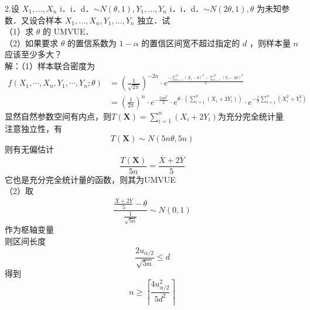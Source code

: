 \documentclass[UTF8]{ctexart}
\begin{document}
\noindent 2.设 $X_1, \ldots, X_n$ i．i．d．$\sim N(\theta, 1), Y_1, \ldots, Y_n$ i．i．d．$\sim N(2 \theta, 1), \theta$ 为未知参数．又设合样本 $X_1, \ldots, X_n, Y_1, \ldots, Y_n$ 独立．试\\
（1）求 $\theta$ 的 UMVUE．\\
（2）如果要求 $\theta$ 的置信系数为 $1-\alpha$ 的置信区间宽不超过指定的 $d$ ，则样本量 $n$应该至少多大？\\
解：（1）样本联合密度为
\[
\begin{aligned}
	f\left(X_1, \cdots, X_n, Y_1, \cdots, Y_n ; \theta\right) 
	&=\left(\frac{1}{\sqrt{2 \pi}}\right)^{-2 n} \cdot e^{\frac{-\sum_{i=1}^n\left(X_i-\theta\right)^2-\sum_{i=1}^n\left(Y_i-2 \theta\right)^2}{2}} \\
	& =\left(\frac{1}{2 \pi}\right)^n \cdot e^{-\frac{5 n \theta^2}{2}} \cdot e^{ \theta \cdot\left(\sum_{i=1}^n\left(X_i+2 Y_i\right)\right)} \cdot e^{-\frac{1}{2} \sum_{i=1}^n\left(X_i^2+Y_i^2\right)}
\end{aligned}
\]
显然自然参数空间有内点，则$T(\boldsymbol{X})=\sum\limits_{i=1}^n \left(X_i+2Y_i \right) $为充分完全统计量\\
注意独立性，有
\[
T(\boldsymbol{X})\sim N(5n\theta,5n)
\]
则有无偏估计
\[
\frac{T(\boldsymbol{X})}{5n}=\frac{\overline{X}+2\overline{Y}}{5}
\]
它也是充分完全统计量的函数，则其为UMVUE\\
（2）取
\[
\frac{\frac{\overline{X}+2\overline{Y}}{5}-\theta}{\frac{1}{\sqrt{5n}}} \sim N(0,1)
\]
作为枢轴变量\\
则区间长度
\[
\frac{2u_{\alpha/2}}{\sqrt{5n}}\le d
\]
得到
\[
n \geq\left\lceil\frac{4 u_{\alpha/2}^2}{5 d^2}\right\rceil
\]\\
\end{document}
